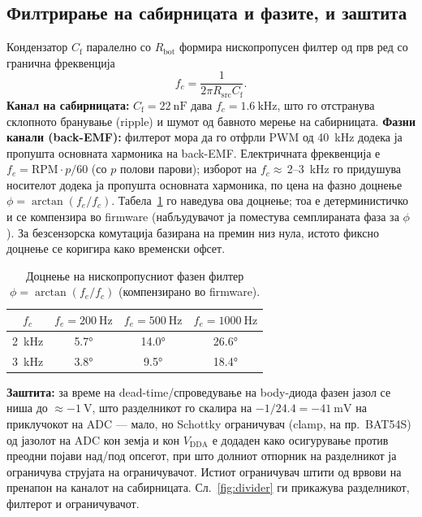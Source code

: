 \documentclass[journal,onecolumn,11pt]{IEEEtran}
\begin{document}
\subsection{Филтрирање на сабирницата и фазите, и заштита}\label{sec:vfilter}
Кондензатор $C_{\mathrm{f}}$ паралелно со $R_{\mathrm{bot}}$ формира нископропусен
филтер од прв ред со гранична фреквенција
\begin{equation}
f_c=\frac{1}{2\pi R_{\mathrm{src}}C_{\mathrm{f}}} .
\end{equation}
\textbf{Канал на сабирницата:} $C_{\mathrm{f}}=\SI{22}{\nano\farad}$ дава
$f_c=\SI{1.6}{\kilo\hertz}$, што го отстранува склопното бранување (ripple) и шумот од
бавното мерење на сабирницата. \textbf{Фазни канали (back-EMF):} филтерот мора да го
отфрли PWM од \SI{40}{\kilo\hertz} додека ја пропушта основната хармоника на back-EMF.
Електричната фреквенција е $f_e=\mathrm{RPM}\cdot p/60$ (со $p$ полови парови); изборот
на $f_c\approx$\,2--\SI{3}{\kilo\hertz} го придушува носителот додека ја пропушта
основната хармоника, по цена на фазно доцнење $\phi=\arctan(f_e/f_c)$.
Табела~\ref{tab:phase} го наведува ова доцнење; тоа е детерминистичко и се компензира
во firmware (набљудувачот ја поместува семплираната фаза за $\phi$). За безсензорска
комутација базирана на премин низ нула, истото фиксно доцнење се коригира како
временски офсет.

\begin{table}[t]
\centering
\caption{Доцнење на нископропусниот фазен филтер $\phi=\arctan(f_e/f_c)$ (компензирано во firmware).}
\label{tab:phase}
\small
\begin{tabular}{c c c c}
\toprule
$f_c$ & $f_e=\SI{200}{\hertz}$ & $f_e=\SI{500}{\hertz}$ & $f_e=\SI{1000}{\hertz}$\\
\midrule
\SI{2}{\kilo\hertz} & \ang{5.7} & \ang{14.0} & \ang{26.6}\\
\SI{3}{\kilo\hertz} & \ang{3.8} & \ang{9.5}  & \ang{18.4}\\
\bottomrule
\end{tabular}
\end{table}

\textbf{Заштита:} за време на dead-time/спроведување на body-диода фазен јазол се ниша
до $\approx\SI{-1}{\volt}$, што разделникот го скалира на
$-1/24.4=\SI{-41}{\milli\volt}$ на приклучокот на ADC --- мало, но Schottky ограничувач
(clamp, на пр.\ BAT54S) од јазолот на ADC кон земја и кон $V_{\mathrm{DDA}}$ е додаден
како осигурување против преодни појави над/под опсегот, при што долниот отпорник на
разделникот ја ограничува струјата на ограничувачот. Истиот ограничувач штити од врвови
на пренапон на каналот на сабирницата. Сл.~\ref{fig:divider} ги прикажува разделникот,
филтерот и ограничувачот.
\end{document}
